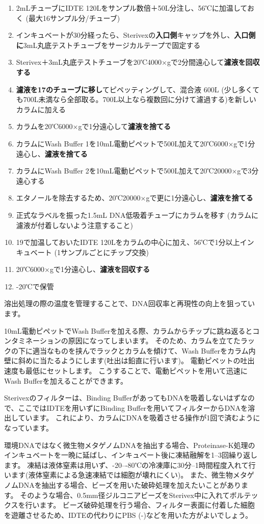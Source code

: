 \documentclass[titlepage,10pt,a4paper,uplatex]{jsbook}
\renewcommand{\textbf}[1]{{\bfseries\sffamily#1}}
\begin{document}
\begin{enumerate}
\item 2mLチューブにIDTE 120{\textmu}Lをサンプル数倍＋50{\textmu}L分注し、56℃に加温しておく (最大16サンプル分/チューブ)
\item インキュベートが30分経ったら、Sterivexの\textbf{入口側}キャップを外し、\textbf{入口側に}3mL丸底テストチューブをサージカルテープで固定する
\item Sterivex＋3mL丸底テストチューブを20℃4000×gで2分間遠心して\textbf{濾液を回収する}
\item \textbf{濾液を17のチューブに移し}てピペッティングして、混合液 600{\textmu}L (少し多くても700{\textmu}L未満なら全部取る。700{\textmu}L以上なら複数回に分けて濾過する)を新しいカラムに加える
\item カラムを20℃6000×gで1分遠心して\textbf{濾液を捨てる}
\item カラムにWash Buffer 1を10mL電動ピペットで500{\textmu}L加えて20℃6000×gで1分遠心し、\textbf{濾液を捨てる}
\item カラムにWash Buffer 2を10mL電動ピペットで500{\textmu}L加えて20℃20000×gで3分遠心する
\item エタノールを除去するため、20℃20000×gで更に1分遠心し、\textbf{濾液を捨てる}
\item 正式なラベルを振った1.5mL DNA低吸着チューブにカラムを移す (カラムに濾液が付着しないよう注意すること)
\item 19で加温しておいたIDTE 120{\textmu}Lをカラムの中心に加え、56℃で1分以上インキュベート (1サンプルごとにチップ交換)
\item 20℃6000×gで1分遠心し、\textbf{濾液を回収する}
\item -20℃で保管
\end{enumerate}

溶出処理の際の温度を管理することで、DNA回収率と再現性の向上を狙っています。

10mL電動ピペットでWash Bufferを加える際、カラムからチップに跳ね返るとコンタミネーションの原因になってしまいます。
そのため、カラムを立てたラックの下に適当なものを挟んでラックとカラムを傾けて、Wash Bufferをカラム内壁に斜めに当たるようにします(吐出は鉛直に行います)。
電動ピペットの吐出速度も最低にセットします。
こうすることで、電動ピペットを用いて迅速にWash Bufferを加えることができます。

Sterivexのフィルターは、Binding BufferがあってもDNAを吸着しないはずなので、ここではIDTEを用いずにBinding Bufferを用いてフィルターからDNAを溶出しています。
これにより、カラムにDNAを吸着させる操作が1回で済むようになっています。

環境DNAではなく微生物メタゲノムDNAを抽出する場合、Proteinase-K処理のインキュベートを一晩に延ばし、インキュベート後に凍結融解を1--3回繰り返します。
凍結は液体窒素は用いず、{-20}--{-80}℃の冷凍庫に30分--1時間程度入れて行います(液体窒素による急速凍結では細胞が壊れにくい)。
また、微生物メタゲノムDNAを抽出する場合、ビーズを用いた破砕処理を加えたいことがあります。
そのような場合、0.5mm径ジルコニアビーズをSterivex中に入れてボルテックスを行います\citep{Ushio2019}。
ビーズ破砕処理を行う場合、フィルター表面に付着した細胞を遊離させるため、IDTEの代わりにPBS (-)などを用いた方がよいでしょう。
\end{document}
